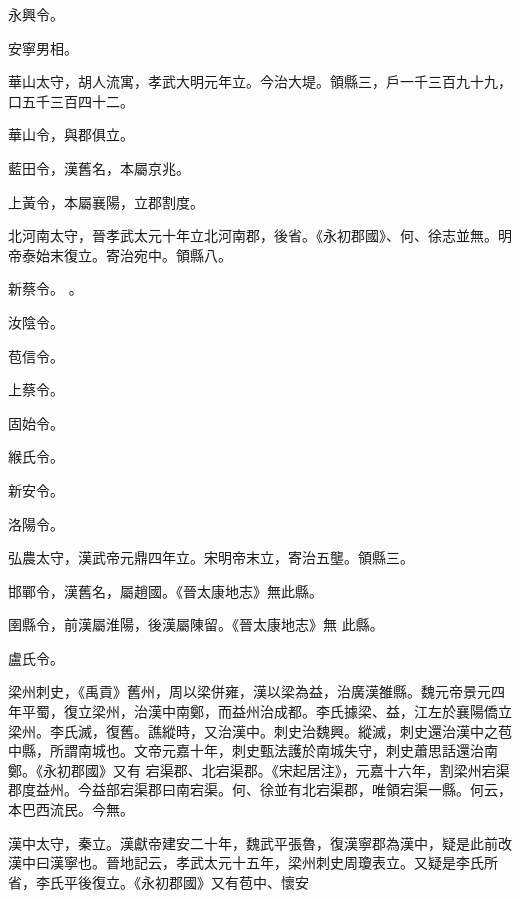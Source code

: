 \begin{pinyinscope}
 永興令。



 安寧男相。



 華山太守，胡人流寓，孝武大明元年立。今治大堤。領縣三，戶一千三百九十九，口五千三百四十二。



 華山令，與郡俱立。



 藍田令，漢舊名，本屬京兆。



 上黃令，本屬襄陽，立郡割度。



 北河南太守，晉孝武太元十年立北河南郡，後省。《永初郡國》、何、徐志並無。明帝泰始末復立。寄治宛中。領縣八。


新蔡令。
 。


汝陰令。


苞信令。


上蔡令。


固始令。


緱氏令。


新安令。


洛陽令。



 弘農太守，漢武帝元鼎四年立。宋明帝末立，寄治五壟。領縣三。



 邯鄲令，漢舊名，屬趙國。《晉太康地志》無此縣。



 圉縣令，前漢屬淮陽，後漢屬陳留。《晉太康地志》無
 此縣。


盧氏令。



 梁州刺史，《禹貢》舊州，周以梁併雍，漢以梁為益，治廣漢雒縣。魏元帝景元四年平蜀，復立梁州，治漢中南鄭，而益州治成都。李氏據梁、益，江左於襄陽僑立梁州。李氏滅，復舊。譙縱時，又治漢中。刺史治魏興。縱滅，刺史還治漢中之苞中縣，所謂南城也。文帝元嘉十年，刺史甄法護於南城失守，刺史蕭思話還治南鄭。《永初郡國》又有
 宕渠郡、北宕渠郡。《宋起居注》，元嘉十六年，割梁州宕渠郡度益州。今益部宕渠郡曰南宕渠。何、徐並有北宕渠郡，唯領宕渠一縣。何云，本巴西流民。今無。


漢中太守，秦立。漢獻帝建安二十年，魏武平張魯，復漢寧郡為漢中，疑是此前改漢中曰漢寧也。晉地記云，孝武太元十五年，梁州刺史周瓊表立。又疑是李氏所省，李氏平後復立。《永初郡國》又有苞中、懷安




\end{pinyinscope}
